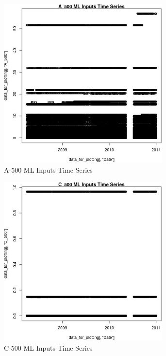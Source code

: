 \begin{figure} 
\centering  
\includegraphics[width=0.77\textwidth]{Code_Outputs/ML_input_report_ML_input_PM25_Step5_part_d_de_duplicated_aves_ML_input_A_500vDate.jpg} 
\caption{\label{fig:ML_input_report_ML_input_PM25_Step5_part_d_de_duplicated_aves_ML_inputA_500vDate}A-500 ML Inputs Time Series} 
\end{figure} 
 

\begin{figure} 
\centering  
\includegraphics[width=0.77\textwidth]{Code_Outputs/ML_input_report_ML_input_PM25_Step5_part_d_de_duplicated_aves_ML_input_C_500vDate.jpg} 
\caption{\label{fig:ML_input_report_ML_input_PM25_Step5_part_d_de_duplicated_aves_ML_inputC_500vDate}C-500 ML Inputs Time Series} 
\end{figure} 
 

